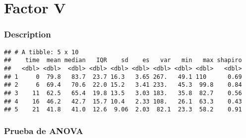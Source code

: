 \documentclass[
]{article}
\begin{document}
\hypertarget{factor-v}{%
\section{Factor V}\label{factor-v}}

\hypertarget{description-5}{%
\subsubsection{Description}\label{description-5}}

\begin{verbatim}
## # A tibble: 5 x 10
##    time  mean median   IQR    sd    es   var   min   max shapiro
##   <dbl> <dbl>  <dbl> <dbl> <dbl> <dbl> <dbl> <dbl> <dbl>   <dbl>
## 1     0  79.8   83.7  23.7 16.3   3.65 267.   49.1 110      0.69
## 2     6  69.4   70.6  22.0 15.2   3.41 233.   45.3  99.8    0.84
## 3    11  62.5   65.4  19.8 13.5   3.03 183.   35.8  82.7    0.56
## 4    16  46.2   42.7  15.7 10.4   2.33 108.   26.1  63.3    0.43
## 5    21  41.8   41.0  12.6  9.06  2.03  82.1  23.3  58.2    0.91
\end{verbatim}

\hypertarget{prueba-de-anova-5}{%
\subsubsection{Prueba de ANOVA}\label{prueba-de-anova-5}}
\end{document}
